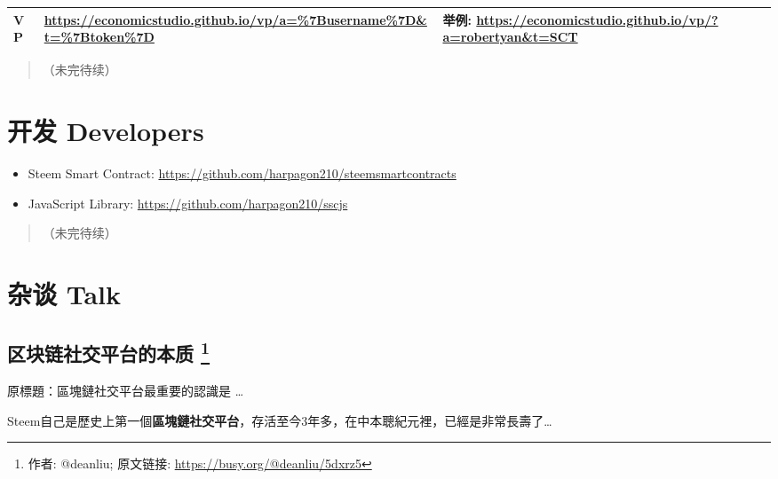 \documentclass[]{ctexbook}
\providecommand{\tightlist}{%
  \setlength{\itemsep}{0pt}\setlength{\parskip}{0pt}}
\begin{document}
\begin{longtable}[]{@{}lll@{}}
\begin{minipage}[t]{0.30\columnwidth}\raggedright
VP\strut
\end{minipage} & \begin{minipage}[t]{0.30\columnwidth}\raggedright
\url{https://economicstudio.github.io/vp/a=\%7Busername\%7D\&t=\%7Btoken\%7D}\strut
\end{minipage} & \begin{minipage}[t]{0.30\columnwidth}\raggedright
举例: \url{https://economicstudio.github.io/vp/?a=robertyan\&t=SCT}\strut
\end{minipage}\tabularnewline
\bottomrule
\end{longtable}

\begin{quote}
（未完待续）
\end{quote}

\hypertarget{developer}{%
\chapter{开发 Developers}\label{developer}}

\begin{itemize}
\tightlist
\item
  Steem Smart Contract: \url{https://github.com/harpagon210/steemsmartcontracts}
\item
  JavaScript Library: \url{https://github.com/harpagon210/sscjs}
\end{itemize}

\begin{quote}
（未完待续）
\end{quote}

\hypertarget{talk}{%
\chapter{杂谈 Talk}\label{talk}}

\hypertarget{steem-nature}{%
\section[区块链社交平台的本质 ]{\texorpdfstring{区块链社交平台的本质 \footnote{作者: @deanliu; 原文链接: \url{https://busy.org/@deanliu/5dxrz5}}}{区块链社交平台的本质 }}\label{steem-nature}}

原標題：區塊鏈社交平台最重要的認識是 \ldots{}

Steem自己是歷史上第一個\textbf{區塊鏈社交平台}，存活至今3年多，在中本聰紀元裡，已經是非常長壽了\ldots{}
\end{document}
